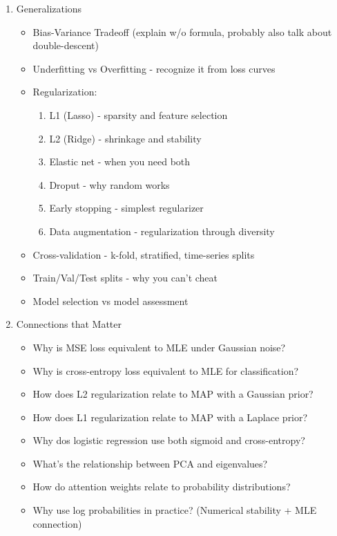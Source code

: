 \documentclass{article}
\begin{document}
\begin{enumerate}
    \item Generalizations
        \begin{itemize}
            \item Bias-Variance Tradeoff (explain w/o formula, probably also talk about double-descent)
            \item Underfitting vs Overfitting - recognize it from loss curves
            \item Regularization:
                \begin{enumerate}[label=\alph*)]
                    \item L1 (Lasso) - sparsity and feature selection
                    \item L2 (Ridge) - shrinkage and stability
                    \item Elastic net - when you need both
                    \item Droput - why random works
                    \item Early stopping - simplest regularizer
                    \item Data augmentation - regularization through diversity
                \end{enumerate}
            \item Cross-validation - k-fold, stratified, time-series splits
            \item Train/Val/Test splits - why you can't cheat
            \item Model selection vs model assessment
        \end{itemize}
    \item Connections that Matter
        \begin{itemize}
            \item Why is MSE loss equivalent to MLE under Gaussian noise?
            \item Why is cross-entropy loss equivalent to MLE for classification?
            \item How does L2 regularization relate to MAP with a Gaussian prior?
            \item How does L1 regularization relate to MAP with a Laplace prior?
            \item Why dos logistic regression use both sigmoid and cross-entropy?
            \item What's the relationship between PCA and eigenvalues?
            \item How do attention weights relate to probability distributions?
            \item Why use log probabilities in practice? (Numerical stability + MLE connection)
        \end{itemize}
\end{enumerate}
\end{document}
